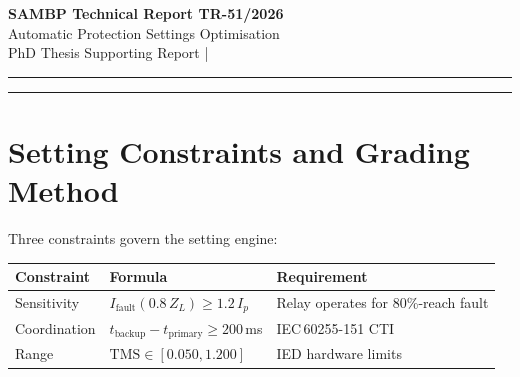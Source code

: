 \documentclass[11pt,a4paper]{article}
\begin{document}
\begin{center}
  {\LARGE\bfseries\color{sambpblue} SAMBP Technical Report TR-51/2026}\\[6pt]
  {\large Automatic Protection Settings Optimisation}\\[10pt]
  {\normalsize PhD Thesis Supporting Report \quad|}
\end{center}

\vspace{2pt}\hrule\vspace{8pt}

\begin{abstract}
\noindent
This report develops an automatic relay settings engine for the 10-bus
SAMBP test network from TR-50.  The engine computes IEC Standard Inverse
pickup currents ($I_p$) and time-multiplier settings (TMS) for all 11
relays subject to sensitivity ($I_\mathrm{fault}>1.2\,I_p$ at 80\%
reach), coordination ($\mathrm{CTI}\geq200$\,ms) and range
($\mathrm{TMS}\in[0.05, 1.20]$) constraints.  Study C produces a
violation-free setting table (0 CTI violations) with TMS values graded
from 0.050 at the network extremities to 0.281 at the grid infeed relay
R01.  Study D shows that an IBR fleet change from $k_\mathrm{ibr}=0.35$
to $k_\mathrm{ibr}=0.60$ (16.7\,pp fault current increase per relay)
requires TMS updates on 6/11 relays with no $I_p$ changes, confirming
that the CUSUM-triggered WAPC retraining protocol from TR-48/TR-50 can
be extended to automatic setting re-dispatch with minimal relay
reconfiguration.  Study E demonstrates 100\% CTI pass rate on all 10
coordination pairs under $\pm10\%$ line impedance uncertainty
($N=500$\,trials), with minimum CTI across all pairs of 0.211\,s ---
above the 0.200\,s threshold with 5.5\% margin.
\end{abstract}

\vspace{4pt}\hrule\vspace{10pt}

\section{Setting Constraints and Grading Method}
\label{sec:method}

Three constraints govern the setting engine:

\begin{center}
\begin{tabular}{@{}lll@{}}
\toprule
Constraint & Formula & Requirement \\
\midrule
Sensitivity & $I_\mathrm{fault}(0.8\,Z_L) \geq 1.2\,I_p$ & Relay operates for 80\%-reach fault \\
Coordination & $t_\mathrm{backup} - t_\mathrm{primary} \geq 200$\,ms & IEC\,60255-151 CTI \\
Range & $\mathrm{TMS} \in [0.050, 1.200]$ & IED hardware limits \\
\bottomrule
\end{tabular}
\end{center}
\end{document}
